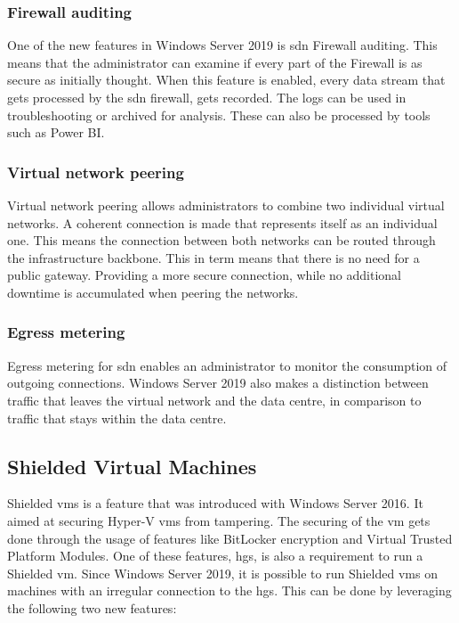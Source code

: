 \subsubsection{Firewall auditing}
One of the new features in Windows Server 2019 is \acrshort{sdn} Firewall auditing. 
This means that the administrator can examine if every part of the Firewall is as secure as initially thought. 
When this feature is enabled, every data stream that gets processed by the \acrshort{sdn} firewall, gets recorded. 
The logs can be used in troubleshooting or archived for analysis. 
These can also be processed by tools such as Power BI.

\subsubsection{Virtual network peering}
Virtual network peering allows administrators to combine two individual virtual networks. 
A coherent connection is made that represents itself as an individual one. 
This means the connection between both networks can be routed through the infrastructure backbone. 
This in term means that there is no need for a public gateway. 
Providing a more secure connection, while no additional downtime is accumulated when peering the networks.

\subsubsection{Egress metering}
Egress metering for \acrshort{sdn} enables an administrator to monitor the consumption of outgoing connections.
Windows Server 2019 also makes a distinction between traffic that leaves the virtual network and the data centre, in comparison to traffic that stays within the data centre. 

\subsection{Shielded Virtual Machines}
Shielded \acrshort{vm}s is a feature that was introduced with Windows Server 2016. It aimed at securing Hyper-V \acrshort{vm}s from tampering. The securing of the \acrshort{vm} gets done through the usage of features like BitLocker encryption and Virtual Trusted Platform Modules. 
One of these features, \acrfull{hgs}, is also a requirement to run a Shielded \acrshort{vm}. 
Since Windows Server 2019, it is possible to run Shielded \acrshort{vm}s on machines with an irregular connection to the \acrshort{hgs}. 
This can be done by leveraging the following two new features:


